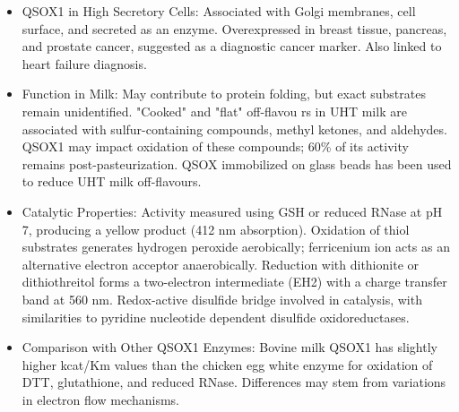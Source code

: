 \begin{itemize}
    \item QSOX1 in High Secretory Cells:
    \subitem Associated with Golgi membranes, cell surface, and secreted as an enzyme.
    \subitem Overexpressed in breast tissue, pancreas, and prostate cancer, suggested as a diagnostic cancer marker.
    \subitem Also linked to heart failure diagnosis.
    
    \item Function in Milk:
    \subitem May contribute to protein folding, but exact substrates remain unidentified.
    \subitem "Cooked" and "flat" off-flavou
    rs in UHT milk are associated with sulfur-containing compounds, methyl ketones, and aldehydes.
    \subitem QSOX1 may impact oxidation of these compounds; 60\% of its activity remains post-pasteurization.
    \subitem QSOX immobilized on glass beads has been used to reduce UHT milk off-flavours.

    \item Catalytic Properties:
    \subitem Activity measured using GSH or reduced RNase at pH 7, producing a yellow product (412 nm absorption).
    \subitem Oxidation of thiol substrates generates hydrogen peroxide aerobically; ferricenium ion acts as an alternative electron acceptor anaerobically.
    \subitem Reduction with dithionite or dithiothreitol forms a two-electron intermediate (EH2) with a charge transfer band at 560 nm.
    \subitem Redox-active disulfide bridge involved in catalysis, with similarities to pyridine nucleotide dependent disulfide oxidoreductases.

    \item Comparison with Other QSOX1 Enzymes:
    \subitem Bovine milk QSOX1 has slightly higher kcat/Km values than the chicken egg white enzyme for oxidation of DTT, glutathione, and reduced RNase.
    \subitem Differences may stem from variations in electron flow mechanisms.
\end{itemize}
\cite*{RM_01}

